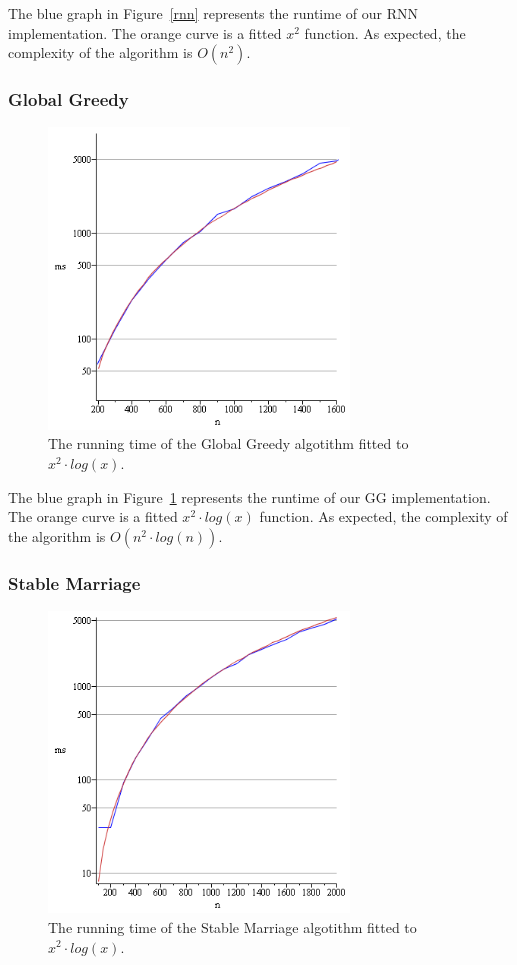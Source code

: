 \documentclass[a4paper,11pt]{article}
\begin{document}
The blue graph in Figure~\ref{rnn} represents the runtime of our RNN implementation. The orange curve is a fitted $x^2$ function. As expected, the complexity of the algorithm is $O(n^{2})$.

\subsubsection{Global Greedy}

\begin{figure}[ht!]
\centering 
\includegraphics[width=80mm]{GG_runtime.png}
\caption{The running time of the Global Greedy algotithm fitted to $x^2 \cdot log(x)$.}
\label{gg} 
\end{figure}

The blue graph in Figure~\ref{gg} represents the runtime of our GG implementation. The orange curve is a fitted $x^2 \cdot log(x)$ function. As expected, the complexity of the algorithm is $O(n^{2} \cdot log(n))$.

\subsubsection{Stable Marriage}

\begin{figure}[ht!]
\centering 
\includegraphics[width=80mm]{SM_runtime.png}
\caption{The running time of the Stable Marriage algotithm fitted to $x^2 \cdot log(x)$.}
\label{sm} 
\end{figure}
\end{document}
